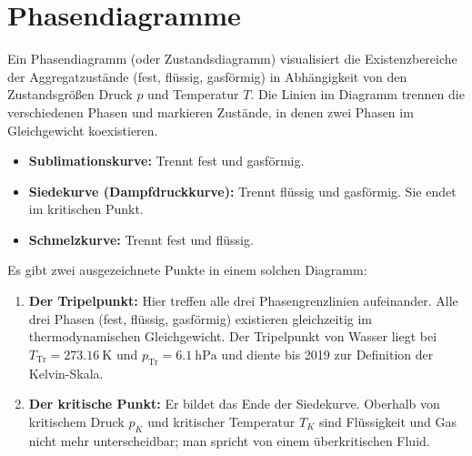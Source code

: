 \section{Phasendiagramme}\label{sec: phasendiagramme}
Ein Phasendiagramm (oder Zustandsdiagramm) visualisiert die Existenzbereiche der Aggregatzustände (fest, flüssig, gasförmig) in Abhängigkeit von den Zustandsgrößen Druck $p$ und Temperatur $T$. Die Linien im Diagramm trennen die verschiedenen Phasen und markieren Zustände, in denen zwei Phasen im Gleichgewicht koexistieren.

\begin{itemize}
    \item \textbf{Sublimationskurve:} Trennt fest und gasförmig.
    \item \textbf{Siedekurve (Dampfdruckkurve):} Trennt flüssig und gasförmig. Sie endet im kritischen Punkt.
    \item \textbf{Schmelzkurve:} Trennt fest und flüssig.
\end{itemize}

Es gibt zwei ausgezeichnete Punkte in einem solchen Diagramm:
\begin{enumerate}
    \item \textbf{Der Tripelpunkt:} Hier treffen alle drei Phasengrenzlinien aufeinander. Alle drei Phasen (fest, flüssig, gasförmig) existieren gleichzeitig im thermodynamischen Gleichgewicht. Der Tripelpunkt von Wasser liegt bei $T_{\text{Tr}} = \SI{273.16}{\kelvin}$ und $p_{\text{Tr}} = \SI{6.1}{\hecto\pascal}$ und diente bis 2019 zur Definition der Kelvin-Skala.
    \item \textbf{Der kritische Punkt:} Er bildet das Ende der Siedekurve. Oberhalb von kritischem Druck $p_K$ und kritischer Temperatur $T_K$ sind Flüssigkeit und Gas nicht mehr unterscheidbar; man spricht von einem überkritischen Fluid.
\end{enumerate}

